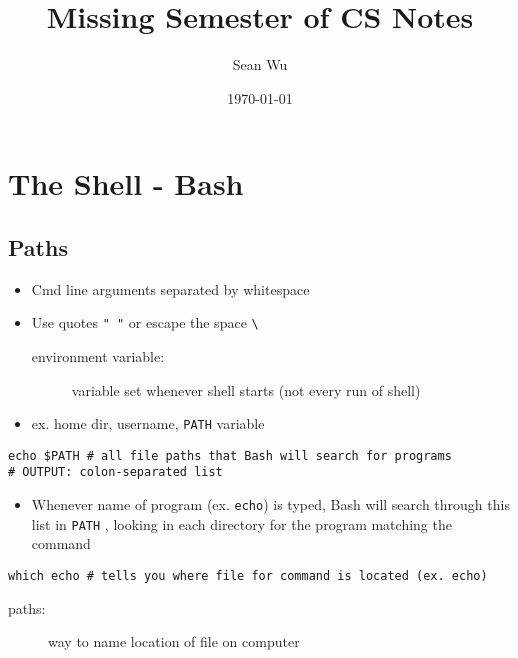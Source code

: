 \documentclass[letterpaper,12pt]{article}
\begin{document}
\title{Missing Semester of CS Notes}
\author{Sean Wu}
\date{\today}
\maketitle

\tableofcontents

\pagebreak

\setlength{\parindent}{0em}
\setlength{\parskip}{1em}

\section{The Shell - Bash}

\subsection{Paths}

\begin{itemize}
 \item Cmd line arguments separated by whitespace
 \item Use quotes \lstinline{" "} or escape the space \lstinline{\ }

       \begin{description}
        \item[environment variable:] variable set whenever shell starts (not every run of shell)
       \end{description}

 \item ex. home dir, username, \lstinline{PATH} variable
\end{itemize}

\begin{lstlisting}
echo $PATH # all file paths that Bash will search for programs
# OUTPUT: colon-separated list
\end{lstlisting}

\begin{itemize}
 \item Whenever name of program (ex. \lstinline{echo}) is typed, Bash will search through this list in \lstinline{PATH} , looking in each directory for the program matching the command
\end{itemize}

\begin{lstlisting}
which echo # tells you where file for command is located (ex. echo)
\end{lstlisting}

\begin{description}
 \item[paths:] way to name location of file on computer
\end{description}
\end{document}
